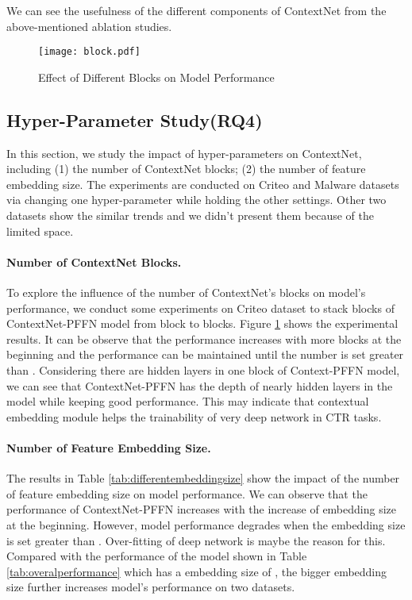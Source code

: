 \documentclass[sigconf]{acmart}
\begin{document}
We can see the usefulness of the different components of ContextNet from the above-mentioned ablation studies.


\begin{figure}
  \setlength{\abovecaptionskip}{0pt}
  \centering
  \texttt{[image: block.pdf]}
  \caption{Effect of Different Blocks on Model Performance}
  \label{fig:blocks}
\end{figure}


\subsection{Hyper-Parameter Study(RQ4)}

In this section, we study the impact of hyper-parameters on ContextNet, including (1) the number of ContextNet blocks; (2) the number of feature embedding size. The experiments are conducted on Criteo and Malware datasets via changing one hyper-parameter while holding the other settings. Other two datasets show the similar trends and we didn't present them because of the limited space.


\paragraph{\textbf{Number of ContextNet Blocks.}}   To explore the influence of the number of ContextNet's blocks on model's performance, we conduct some experiments on Criteo dataset to stack blocks of ContextNet-PFFN model from  block to  blocks. Figure \ref{fig:blocks} shows the experimental results. It can be observe that the performance increases with more blocks at the beginning and  the performance can be maintained until the number is set greater than . Considering there are  hidden layers in one block of Context-PFFN model, we can see that ContextNet-PFFN has the depth of nearly  hidden layers in the model while keeping good performance. This may indicate that contextual embedding module helps the trainability of very deep network in CTR tasks.


\paragraph{\textbf{Number of Feature Embedding Size.}} The results in Table \ref{tab:differentembeddingsize} show the impact of the number of feature embedding size on model performance. We can observe that the performance of ContextNet-PFFN increases with the increase of embedding size at the beginning. However, model performance degrades when the embedding size is set greater than . Over-fitting of deep network is maybe the reason for this. Compared with the performance of  the model  shown in Table \ref{tab:overalperformance} which has a embedding size of , the bigger embedding size further increases model's performance on two datasets.
\end{document}
